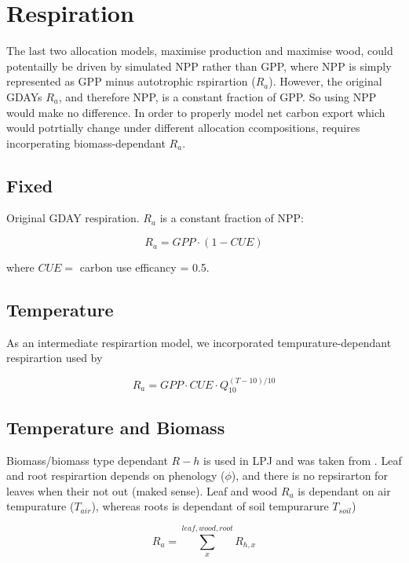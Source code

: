 \section{Respiration}
The last two allocation models, maximise production and maximise wood, could potentailly be driven by simulated NPP rather than GPP, where NPP is simply represented as GPP minus autotrophic rspirartion ($R_{a}$). However, the original GDAYs $R_{a}$, and therefore NPP, is a constant fraction of GPP. So using NPP would make no difference. In order to properly model net carbon export which would potrtially change under different allocation ccompositions, requires incorperating biomass-dependant $R_{a}$.

\subsection{Fixed}

Original GDAY respiration. $R_{a}$ is a constant fraction of NPP:

\begin{equation}
	R_{a} = GPP \cdot  (1 - CUE)
\end{equation}

where $CUE =$ carbon use efficancy = 0.5.

\subsection{Temperature}
As an intermediate respirartion model, we incorporated tempurature-dependant respirartion used by \citet{Medlyn2000}

\begin{equation}
	R_{a} = GPP \cdot CUE \cdot Q_{10}^{(T-10)/10}
\end{equation}

\subsection{Temperature and Biomass}
Biomass/biomass type dependant $R-{h}$ is used in LPJ and was taken from \citet{Sitch2003}. Leaf and root respirartion depends on phenology ($\phi$), and there is no repsirarton for leaves when their not out (maked sense). Leaf and wood $R_{a}$ is dependant on air tempurature ($T_{air}$), whereas roots is dependant of soil tempurarure $T_{soil}$)


\begin{equation}
	R_{a} = \sum_{x}^{leaf,wood,root} R_{h,x}
\end{equation}

